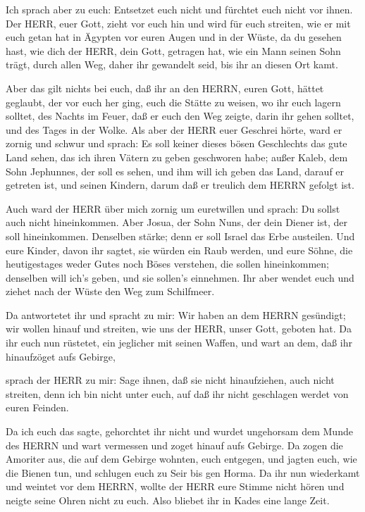  Ich sprach aber zu euch: Entsetzet euch nicht und fürchtet
euch nicht vor ihnen.  Der HERR, euer Gott, zieht vor euch
hin und wird für euch streiten, wie er mit euch getan hat in Ägypten vor
euren Augen  und in der Wüste, da du gesehen hast, wie dich
der HERR, dein Gott, getragen hat, wie ein Mann seinen Sohn trägt, durch
allen Weg, daher ihr gewandelt seid, bis ihr an diesen Ort kamt.

 Aber das gilt nichts bei euch, daß ihr an den HERRN, euren
Gott, hättet geglaubt,  der vor euch her ging, euch die
Stätte zu weisen, wo ihr euch lagern solltet, des Nachts im Feuer, daß
er euch den Weg zeigte, darin ihr gehen solltet, und des Tages in der
Wolke.  Als aber der HERR euer Geschrei hörte, ward er
zornig und schwur und sprach:  Es soll keiner dieses bösen
Geschlechts das gute Land sehen, das ich ihren Vätern zu geben
geschworen habe;  außer Kaleb, dem Sohn Jephunnes, der soll
es sehen, und ihm will ich geben das Land, darauf er getreten ist, und
seinen Kindern, darum daß er treulich dem HERRN gefolgt ist.

 Auch ward der HERR über mich zornig um euretwillen und
sprach: Du sollst auch nicht hineinkommen.  Aber Josua, der
Sohn Nuns, der dein Diener ist, der soll hineinkommen. Denselben stärke;
denn er soll Israel das Erbe austeilen.  Und eure Kinder,
davon ihr sagtet, sie würden ein Raub werden, und eure Söhne, die
heutigestages weder Gutes noch Böses verstehen, die sollen hineinkommen;
denselben will ich's geben, und sie sollen's einnehmen. 
Ihr aber wendet euch und ziehet nach der Wüste den Weg zum Schilfmeer.

 Da antwortetet ihr und spracht zu mir: Wir haben an dem
HERRN gesündigt; wir wollen hinauf und streiten, wie uns der HERR, unser
Gott, geboten hat. Da ihr euch nun rüstetet, ein jeglicher mit seinen
Waffen, und wart an dem, daß ihr hinaufzöget aufs Gebirge,

 sprach der HERR zu mir: Sage ihnen, daß sie nicht
hinaufziehen, auch nicht streiten, denn ich bin nicht unter euch, auf
daß ihr nicht geschlagen werdet von euren Feinden.

 Da ich euch das sagte, gehorchtet ihr nicht und wurdet
ungehorsam dem Munde des HERRN und wart vermessen und zoget hinauf aufs
Gebirge.  Da zogen die Amoriter aus, die auf dem Gebirge
wohnten, euch entgegen, und jagten euch, wie die Bienen tun, und
schlugen euch zu Seir bis gen Horma.  Da ihr nun wiederkamt
und weintet vor dem HERRN, wollte der HERR eure Stimme nicht hören und
neigte seine Ohren nicht zu euch.  Also bliebet ihr in
Kades eine lange Zeit.


